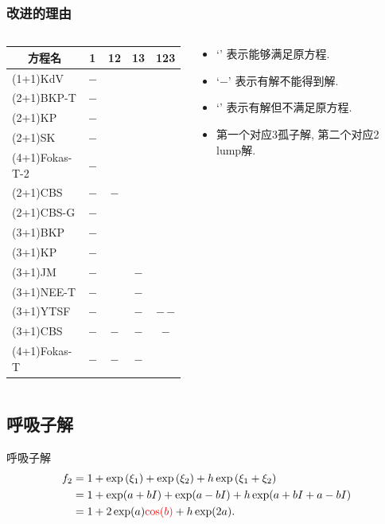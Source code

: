 \documentclass[handout]{beamer}
\newcommand{\sbrace}[1]{\left(#1\right)}
\newcommand{\red}[1]{{\color{red}#1}}
\newcommand{\tpa}{\checkmark}
\newcommand{\tpb}{$-$}
\newcommand{\tpc}{\texttimes}
\begin{document}
\begin{frame}
\frametitle{改进的理由}
\begin{columns}
\begin{column}{0.65\textwidth}
\begin{table}
\centering
\small 
\begin{tabular}{lcccc}
\hline
\multicolumn{1}{c}{方程名} & 1 & 12 & 13 & 123 \\ 
\hline
(1+1)KdV & \tpa\tpb & & & \\
(2+1)BKP-T & \tpa\tpb & \tpa\tpa & & \\
(2+1)KP &\tpa\tpb &\tpa\tpa & & \\
(2+1)SK &\tpa\tpb &\tpa\tpa & & \\
(4+1)Fokas-T-2 &\tpa\tpb &\tpa\tpa & & \\
(2+1)CBS & \tpa\tpb & \tpa\tpb & & \\
(2+1)CBS-G & \tpa\tpb & \tpc\tpc & & \\
(3+1)BKP &\tpa\tpb &\tpa\tpa &\tpa\tpa &\tpc\tpc \\
(3+1)KP &\tpa\tpb &\tpa\tpa &\tpa\tpa &\tpc\tpc \\
(3+1)JM &\tpa\tpb &\tpa\tpa &\tpa\tpb &\tpc\tpc \\
(3+1)NEE-T &\tpa\tpb &\tpa\tpa &\tpa\tpb &\tpc\tpc \\
(3+1)YTSF &\tpa\tpb &\tpa\tpa &\tpa\tpb &\tpb\,\tpb \\
(3+1)CBS &\tpa\tpb &\tpa\tpb &\tpa\tpb &\tpa\tpb \\
(4+1)Fokas-T &\tpa\tpb &\tpa\tpb &\tpa\tpb &\tpc\tpc \\
\hline
\end{tabular}
\end{table}
\end{column}
\begin{column}{0.35\textwidth}
\begin{itemize}
\item `\tpa{}' 表示能够满足原方程.
\item `\tpb{}' 表示有解不能得到解.
\item `\tpc{}' 表示有解但不满足原方程.
\item 第一个对应3孤子解, 第二个对应2 lump解.
\end{itemize}
\end{column}
\end{columns}
\end{frame}

\subsection{呼吸子解}
\begin{frame}{呼吸子解}
\begin{equation}
\begin{aligned}
f_2&=1+\exp\sbrace{\xi_1}+\exp\sbrace{\xi_2}+h\exp\sbrace{\xi_1+\xi_2} \\ 
&=1+\exp(a+bI)+\exp(a-bI)+h\exp(a+bI+a-bI) \\ 
&=1+2\exp(a)\red{\cos(b)}+h\exp(2a).
\end{aligned}
\end{equation}
\end{frame}
\end{document}
